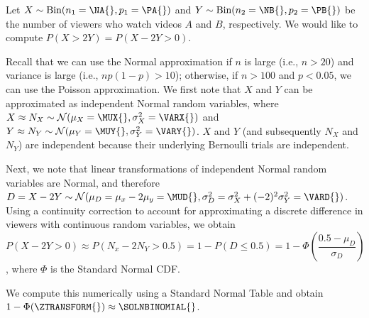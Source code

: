 Let $X \sim \text{Bin}(n_1 = \NA{}, p_1 = \PA{})$ and $Y\sim\text{Bin}(n_2 = \NB{}, p_2 = \PB{})$ be the number of viewers who watch videos $A$ and $B$, respectively. We would like to compute $P(X > 2Y) = P(X - 2Y > 0)$.

Recall that we can use the Normal approximation if $n$ is large (i.e., $n > 20$) and variance is large (i.e., $np(1-p) > 10$); otherwise, if $n > 100$ and $p < 0.05$, we can use the Poisson approximation. We first note that $X$ and $Y$ can be approximated as independent Normal random variables, where $X \approx N_X\sim\mathcal{N}(\mu_X = \MUX{}, \sigma_X^2 = \VARX{})$ and $Y \approx N_Y\sim\mathcal{N}(\mu_Y = \MUY{}, \sigma_Y^2 = \VARY{})$. $X$ and $Y$ (and subsequently $N_X$ and $N_Y$) are independent because their underlying Bernoulli trials are independent.

Next, we note that linear transformations of independent Normal random variables are Normal, and therefore $D = X - 2Y \sim\mathcal{N}(\mu_D = \mu_x - 2 \mu_y = \MUD{}, \sigma_D^2 = \sigma_X^2 + (-2)^2 \sigma_Y^2 = \VARD{})$. Using a continuity correction to account for approximating a discrete difference in viewers with continuous random variables, we obtain $P(X - 2Y > 0) \approx P(N_x - 2N_Y > 0.5) = 1 - P(D \leq 0.5) = 1 - \Phi\left(\dfrac{0.5 - \mu_D}{\sigma_D}\right)$, where $\Phi$ is the Standard Normal CDF.

We compute this numerically using a Standard Normal Table and obtain $1 - \Phi(\ZTRANSFORM{}) \approx \SOLNBINOMIAL{}$.
